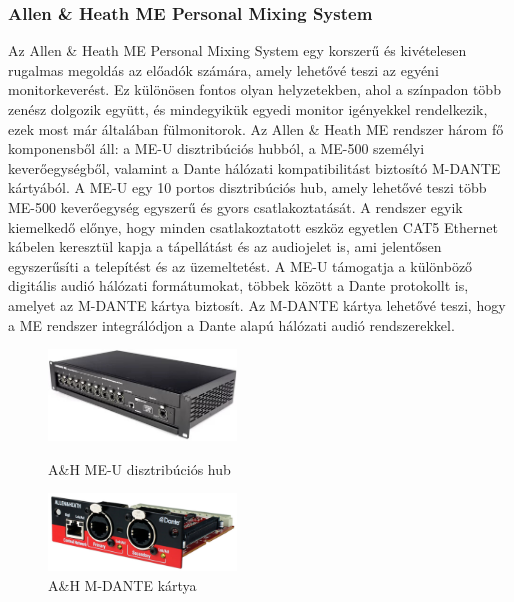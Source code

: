 \subsubsection{Allen \& Heath ME Personal Mixing System} %
Az Allen \& Heath ME Personal Mixing System egy korszerű és kivételesen
rugalmas megoldás az előadók számára, amely lehetővé teszi az egyéni
monitorkeverést. Ez különösen fontos olyan helyzetekben,
ahol a színpadon több zenész dolgozik együtt, és mindegyikük
egyedi monitor igényekkel rendelkezik, ezek most már általában fülmonitorok.
Az Allen \& Heath ME rendszer három fő komponensből áll: a ME-U 
disztribúciós hubból, a ME-500 személyi keverőegységből, valamint a 
Dante hálózati kompatibilitást biztosító M-DANTE kártyából.
A ME-U egy 10 portos disztribúciós hub, amely lehetővé teszi több 
ME-500 keverőegység egyszerű és gyors csatlakoztatását. A rendszer egyik
kiemelkedő előnye, hogy minden csatlakoztatott eszköz egyetlen CAT5 
Ethernet kábelen keresztül kapja a tápellátást és az audiojelet is, ami
jelentősen egyszerűsíti a telepítést és az üzemeltetést. A ME-U támogatja 
a különböző digitális audió hálózati formátumokat, többek között a 
Dante protokollt is, amelyet az M-DANTE kártya biztosít.
Az M-DANTE kártya lehetővé teszi, hogy a ME rendszer integrálódjon 
a Dante alapú hálózati audió rendszerekkel.
\begin{figure}[H]
    \centering
    \begin{minipage}{0.45\textwidth}
        \centering
        \includegraphics[width=50mm, keepaspectratio]{figures/me_u.jpg}
        \caption{A\&H ME-U disztribúciós hub}\label{fig:me_u}
    \end{minipage}\hfill
    \begin{minipage}{0.45\textwidth}
        \centering
        \includegraphics[width=50mm, keepaspectratio]{figures/m_dante.jpg}
        \caption{A\&H M-DANTE kártya}\label{fig:m_dante}
    \end{minipage}
\end{figure}
